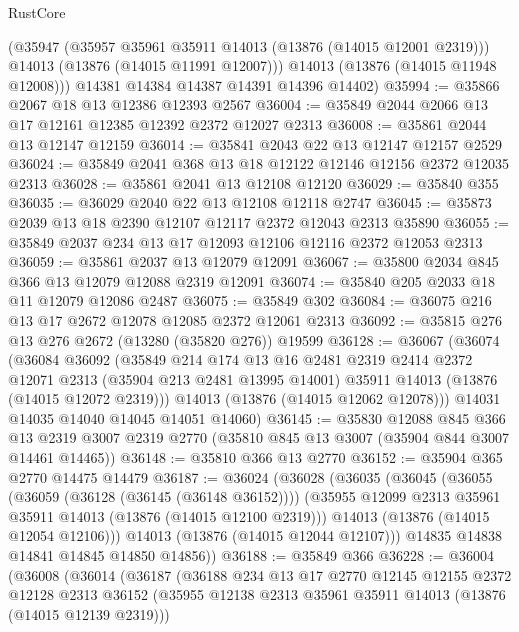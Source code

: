 \begin{lexlean}{RustCore}
\begin{coremodule}
        (@35947
          (@35957 @35961 @35911 @14013 (@13876 (@14015 @12001 @2319)))
          @14013
          (@13876 (@14015 @11991 @12007)))
        @14013
        (@13876 (@14015 @11948 @12008)))
      @14381
      @14384
      @14387
      @14391
      @14396
      @14402)
@35994 := @35866 @2067 @18 @13 @12386 @12393 @2567
@36004 := @35849 @2044 @2066 @13 @17 @12161 @12385 @12392 @2372 @12027 @2313
@36008 := @35861 @2044 @13 @12147 @12159
@36014 := @35841 @2043 @22 @13 @12147 @12157 @2529
@36024 := @35849 @2041 @368 @13 @18 @12122 @12146 @12156 @2372 @12035 @2313
@36028 := @35861 @2041 @13 @12108 @12120
@36029 := @35840 @355
@36035 := @36029 @2040 @22 @13 @12108 @12118 @2747
@36045 := @35873 @2039 @13 @18 @2390 @12107 @12117 @2372 @12043 @2313 @35890
@36055 := @35849 @2037 @234 @13 @17 @12093 @12106 @12116 @2372 @12053 @2313
@36059 := @35861 @2037 @13 @12079 @12091
@36067 := @35800 @2034 @845 @366 @13 @12079 @12088 @2319 @12091
@36074 := @35840 @205 @2033 @18 @11 @12079 @12086 @2487
@36075 := @35849 @302
@36084 := @36075 @216 @13 @17 @2672 @12078 @12085 @2372 @12061 @2313
@36092 := @35815 @276 @13 @276 @2672 (@13280 (@35820 @276)) @19599
@36128 := @36067
    (@36074
      (@36084
        @36092
        (@35849
          @214
          @174
          @13
          @16
          @2481
          @2319
          @2414
          @2372
          @12071
          @2313
          (@35904 @213 @2481 @13995 @14001)
          @35911
          @14013
          (@13876 (@14015 @12072 @2319)))
        @14013
        (@13876 (@14015 @12062 @12078)))
      @14031
      @14035
      @14040
      @14045
      @14051
      @14060)
@36145 := @35830
    @12088
    @845
    @366
    @13
    @2319
    @3007
    @2319
    @2770
    (@35810 @845 @13 @3007 (@35904 @844 @3007 @14461 @14465))
@36148 := @35810 @366 @13 @2770
@36152 := @35904 @365 @2770 @14475 @14479
@36187 := @36024
    (@36028
      (@36035
        (@36045
          (@36055
            (@36059 (@36128 (@36145 (@36148 @36152))))
            (@35955 @12099 @2313 @35961 @35911 @14013 (@13876 (@14015 @12100 @2319)))
            @14013
            (@13876 (@14015 @12054 @12106)))
          @14013
          (@13876 (@14015 @12044 @12107)))
        @14835
        @14838
        @14841
        @14845
        @14850
        @14856))
@36188 := @35849 @366
@36228 := @36004
    (@36008
      (@36014
        (@36187
          (@36188
            @234
            @13
            @17
            @2770
            @12145
            @12155
            @2372
            @12128
            @2313
            @36152
            (@35955 @12138 @2313 @35961 @35911 @14013 (@13876 (@14015 @12139 @2319)))

\end{coremodule}
\end{lexlean}
